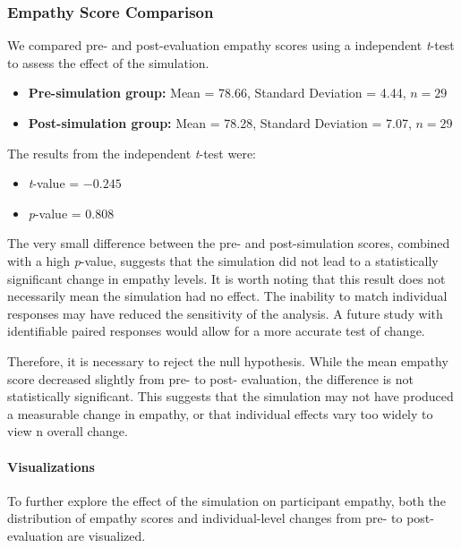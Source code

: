 \subsubsection{Empathy Score Comparison}

We compared pre- and post-evaluation empathy scores using a independent \textit{t}-test to assess the effect of the simulation.

\begin{itemize}
    \item \textbf{Pre-simulation group:} Mean = 78.66, Standard Deviation = 4.44, $n = 29$
    \item \textbf{Post-simulation group:} Mean = 78.28, Standard Deviation = 7.07, $n = 29$
\end{itemize}

The results from the independent \textit{t}-test were:

\begin{itemize}
    \item \textit{t}-value = \(-0.245\)
    \item \textit{p}-value = \(0.808\)
\end{itemize}

The very small difference between the pre- and post-simulation scores, combined with a high \textit{p}-value, suggests that the simulation did not lead to a statistically significant change in empathy levels. It is worth noting that this result does not necessarily mean the simulation had no effect. The inability to match individual responses may have reduced the sensitivity of the analysis. A future study with identifiable paired responses would allow for a more accurate test of change.

\vspace{1em}

Therefore, it is necessary to reject the null hypothesis. While the mean empathy score decreased slightly from pre- to post- evaluation, the difference is not statistically significant. This suggests that the simulation may not have produced a measurable change in empathy, or that individual effects vary too widely to view n overall change.

\paragraph{Visualizations}

To further explore the effect of the simulation on participant empathy, both the distribution of empathy scores and individual-level changes from pre- to post-evaluation are visualized. 

